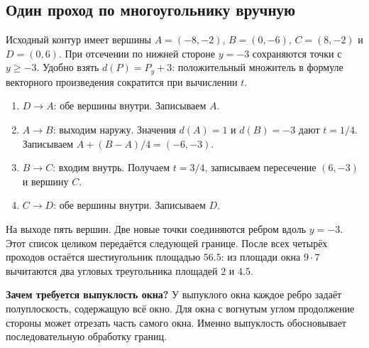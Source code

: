\documentclass[11pt,a4paper]{extarticle}
\begin{document}
\subsection*{Один проход по многоугольнику вручную}
Исходный контур имеет вершины $A=(-8,-2)$, $B=(0,-6)$, $C=(8,-2)$ и $D=(0,6)$. При отсечении по нижней стороне $y=-3$ сохраняются точки с $y\ge-3$. Удобно взять $d(P)=P_y+3$: положительный множитель в формуле векторного произведения сократится при вычислении $t$.
\begin{enumerate}
\item $D\to A$: обе вершины внутри. Записываем $A$.
\item $A\to B$: выходим наружу. Значения $d(A)=1$ и $d(B)=-3$ дают $t=1/4$. Записываем $A+(B-A)/4=(-6,-3)$.
\item $B\to C$: входим внутрь. Получаем $t=3/4$, записываем пересечение $(6,-3)$ и вершину $C$.
\item $C\to D$: обе вершины внутри. Записываем $D$.
\end{enumerate}
На выходе пять вершин. Две новые точки соединяются ребром вдоль $y=-3$. Этот список целиком передаётся следующей границе. После всех четырёх проходов остаётся шестиугольник площадью $56.5$: из площади окна $9\cdot7$ вычитаются два угловых треугольника площадей $2$ и $4.5$.

\textbf{Зачем требуется выпуклость окна?} У выпуклого окна каждое ребро задаёт полуплоскость, содержащую всё окно. Для окна с вогнутым углом продолжение стороны может отрезать часть самого окна. Именно выпуклость обосновывает последовательную обработку границ.
\end{document}
